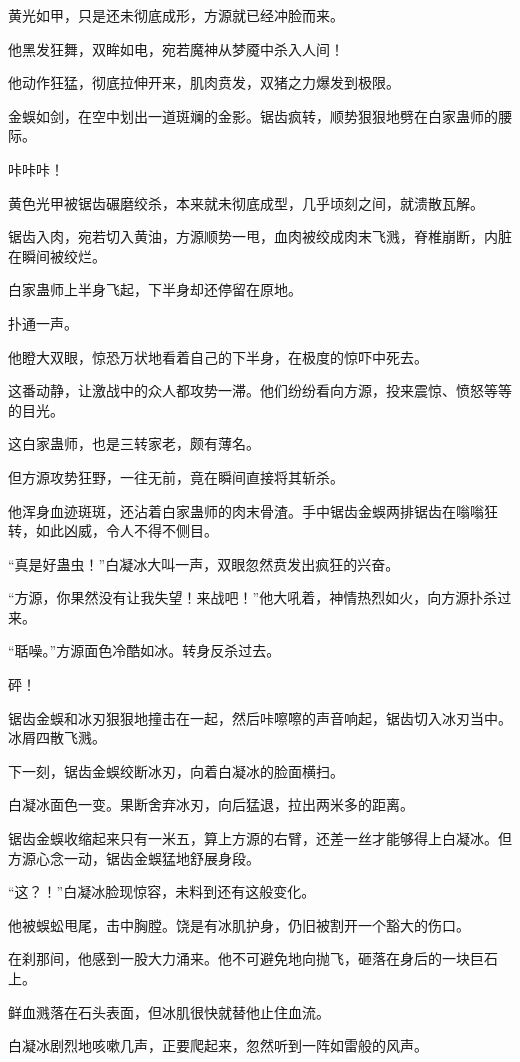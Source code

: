 \begin{this_body}
黄光如甲，只是还未彻底成形，方源就已经冲脸而来。

他黑发狂舞，双眸如电，宛若魔神从梦魇中杀入人间！

他动作狂猛，彻底拉伸开来，肌肉贲发，双猪之力爆发到极限。

金蜈如剑，在空中划出一道斑斓的金影。锯齿疯转，顺势狠狠地劈在白家蛊师的腰际。

咔咔咔！

黄色光甲被锯齿碾磨绞杀，本来就未彻底成型，几乎顷刻之间，就溃散瓦解。

锯齿入肉，宛若切入黄油，方源顺势一甩，血肉被绞成肉末飞溅，脊椎崩断，内脏在瞬间被绞烂。

白家蛊师上半身飞起，下半身却还停留在原地。

扑通一声。

他瞪大双眼，惊恐万状地看着自己的下半身，在极度的惊吓中死去。

这番动静，让激战中的众人都攻势一滞。他们纷纷看向方源，投来震惊、愤怒等等的目光。

这白家蛊师，也是三转家老，颇有薄名。

但方源攻势狂野，一往无前，竟在瞬间直接将其斩杀。

他浑身血迹斑斑，还沾着白家蛊师的肉末骨渣。手中锯齿金蜈两排锯齿在嗡嗡狂转，如此凶威，令人不得不侧目。

“真是好蛊虫！”白凝冰大叫一声，双眼忽然贲发出疯狂的兴奋。

“方源，你果然没有让我失望！来战吧！”他大吼着，神情热烈如火，向方源扑杀过来。

“聒噪。”方源面色冷酷如冰。转身反杀过去。

砰！

锯齿金蜈和冰刃狠狠地撞击在一起，然后咔嚓嚓的声音响起，锯齿切入冰刃当中。冰屑四散飞溅。

下一刻，锯齿金蜈绞断冰刃，向着白凝冰的脸面横扫。

白凝冰面色一变。果断舍弃冰刃，向后猛退，拉出两米多的距离。

锯齿金蜈收缩起来只有一米五，算上方源的右臂，还差一丝才能够得上白凝冰。但方源心念一动，锯齿金蜈猛地舒展身段。

“这？！”白凝冰脸现惊容，未料到还有这般变化。

他被蜈蚣甩尾，击中胸膛。饶是有冰肌护身，仍旧被割开一个豁大的伤口。

在刹那间，他感到一股大力涌来。他不可避免地向抛飞，砸落在身后的一块巨石上。

鲜血溅落在石头表面，但冰肌很快就替他止住血流。

白凝冰剧烈地咳嗽几声，正要爬起来，忽然听到一阵如雷般的风声。


\end{this_body}
